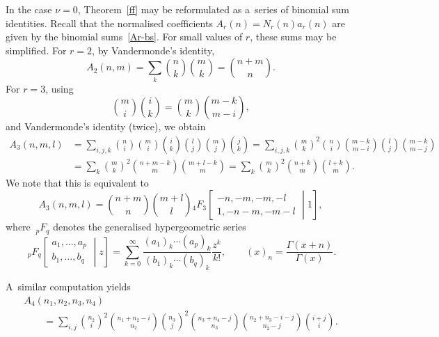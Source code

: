 \documentclass[pdftex]{sigma}
\theoremstyle{definition}
\begin{document}
In the case $\nu=0$, Theorem~\ref{ff} may be reformulated as a~series of
binomial sum identities.
Recall that the normalised coefficients $A_r(n)=N_r(n)a_r(n)$ are given
by the binomial sums~\eqref{Ar-bs}.
For small values of $r$, these sums may be simplified.
For $r=2$, by Vandermonde's identity,
\[A_2(n,m)=\sum_k {n \choose k}{m \choose k} = {n+m\choose n}.\]
For $r=3$, using
\[{m \choose i} {i\choose k} = {m\choose k} {m-k\choose m-i},\]
and Vandermonde's identity (twice), we obtain
\begin{align}\label{A3}
A_3(n,m,l) &= \sum_{i,j,k} {n \choose i}{m \choose i}{i\choose k}
{l \choose j} {m \choose j} {j\choose k} = \sum_{i,j,k} {m \choose k}^2 {n \choose i} {m-k\choose m-i} {l \choose j} {m-k\choose m-j} \nonumber\\
&=\sum_k {m \choose k}^2 {n+m-k \choose m} {m+l-k \choose m}=\sum_k {m \choose k}^2 {n+k \choose m} {l+k \choose m}.
\end{align}
We note that this is equivalent to
\[A_3(n,m,l)= {n+m\choose n} {m+l\choose l} {}_4 F_3\left[
\! \begin{array}{c} -n,-m,-m,-l \\ 1,-n-m,-m-l \end{array} \middle| 1\right],\]
where $~_p F_q$ denotes the generalised hypergeometric series
\[~_p F_q\left[
\! \begin{array}{c} a_1,\dots,a_p \\ b_1,\dots,b_q \end{array} \middle| z\right]=
\sum_{k=0}^\infty \frac{(a_1)_k\cdots (a_p)_k}{(b_1)_k\cdots (b_q)_k} \frac{z^k}{k!},\qquad (x)_n=\frac{\Gamma(x+n)}{\Gamma(x)}.\]

A~similar computation yields
\begin{gather*}\label{a4}
A_4(n_1,n_2,n_3,n_4)\nonumber \\
\qquad= \sum_{i,j}
{n_2 \choose i}^2 {n_1+n_2-i \choose n_2} {n_3 \choose j}^2 {n_3+n_4-j \choose n_3}
{n_2+n_3-i-j \choose n_2-j} {i+j \choose i}.
\end{gather*}
\end{document}

